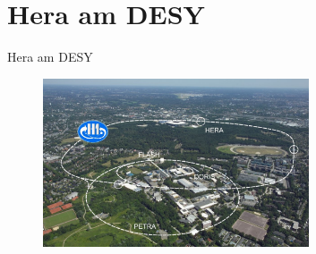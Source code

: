 \documentclass[aspectratio=1610, 9pt]{beamer}
\begin{document}
\section{Hera am DESY}

\begin{frame}{Hera am DESY}
  \begin{figure}
    \centering
    \includegraphics[width=0.7\textwidth]{images/DESY.jpg}
  \end{figure}
\end{frame}
\end{document}

